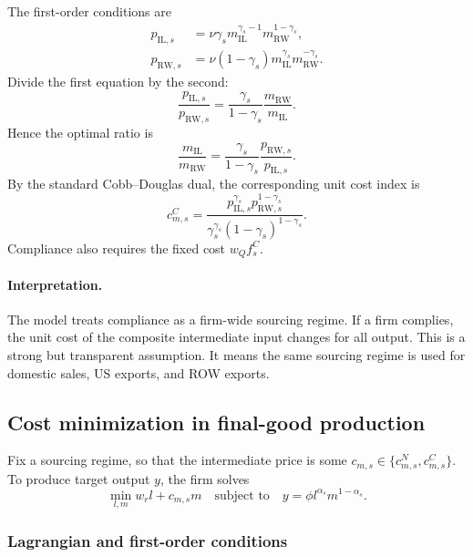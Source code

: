 \documentclass[11pt]{article}
\begin{document}
The first-order conditions are
\begin{align}
p_{\mathrm{IL},s} &= \nu\gamma_s m_{\mathrm{IL}}^{\gamma_s-1}m_{\mathrm{RW}}^{1-\gamma_s},\\
p_{\mathrm{RW},s} &= \nu(1-\gamma_s)m_{\mathrm{IL}}^{\gamma_s}m_{\mathrm{RW}}^{-\gamma_s}.
\end{align}
Divide the first equation by the second:
\begin{equation}
\frac{p_{\mathrm{IL},s}}{p_{\mathrm{RW},s}} = \frac{\gamma_s}{1-\gamma_s}\frac{m_{\mathrm{RW}}}{m_{\mathrm{IL}}}.
\end{equation}
Hence the optimal ratio is
\begin{equation}
\frac{m_{\mathrm{IL}}}{m_{\mathrm{RW}}}=\frac{\gamma_s}{1-\gamma_s}\frac{p_{\mathrm{RW},s}}{p_{\mathrm{IL},s}}.
\end{equation}
By the standard Cobb--Douglas dual, the corresponding unit cost index is
\begin{equation}
c^C_{m,s}=\frac{p_{\mathrm{IL},s}^{\gamma_s}p_{\mathrm{RW},s}^{1-\gamma_s}}{\gamma_s^{\gamma_s}(1-\gamma_s)^{1-\gamma_s}}.
\label{eq:cm_compliant}
\end{equation}
Compliance also requires the fixed cost \(w_Q f_s^C\).

\paragraph{Interpretation.}
The model treats compliance as a firm-wide sourcing regime. If a firm complies, the unit cost of the composite intermediate input changes for all output. This is a strong but transparent assumption. It means the same sourcing regime is used for domestic sales, US exports, and ROW exports.

\subsection{Cost minimization in final-good production}

Fix a sourcing regime, so that the intermediate price is some \(c_{m,s}\in\{c^N_{m,s},c^C_{m,s}\}\). To produce target output \(y\), the firm solves
\begin{equation}
\min_{l,m} w_rl + c_{m,s}m
\quad\text{subject to}\quad
y=\phi l^{\alpha_s}m^{1-\alpha_s}.
\label{eq:firm_costmin}
\end{equation}

\subsubsection{Lagrangian and first-order conditions}
\end{document}
